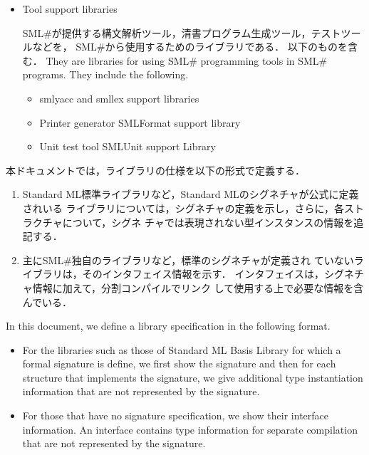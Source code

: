 \documentclass{jbook}
\newcommand{\txt}[2]{#2}
\newcommand{\smlsharp}{SML\#}
\begin{document}
\begin{itemize}
\item \txt{ツールのサポートライブラリ}{Tool support libraries}

\ifjp%
	\smlsharp{}が提供する構文解析ツール，清書プログラム生成ツール，テストツールなどを，
\smlsharp{}から使用するためのライブラリである．
	以下のものを含む．
\else%
	They are libraries for using \smlsharp{} programming tools in 
\smlsharp{} programs.
	They include the following.
\fi%

\begin{itemize}
\item \txt{smlyaccとsmllexのサポートライブラリ}{smlyacc and smllex
support libraries}
\item \txt{清書ツールSMLFormatサポートライブラリ}{Printer generator SMLFormat support library}
\item \txt{ユニットテストツールSMLUnitサポートライブラリ}{Unit test tool SMLUnit support Library}
\end{itemize}
\end{itemize}

\ifjp%
	本ドキュメントでは，ライブラリの仕様を以下の形式で定義する．
\begin{enumerate}
\item Standard ML標準ライブラリなど，Standard MLのシグネチャが公式に定義されいる
ライブラリについては，シグネチャの定義を示し，さらに，各ストラクチャについて，シグネ
チャでは表現されない型インスタンスの情報を追記する．
\item 	主に\smlsharp{}独自のライブラリなど，標準のシグネチャが定義され
ていないライブラリは，そのインタフェイス情報を示す．
	インタフェイスは，シグネチャ情報に加えて，分割コンパイルでリンク
して使用する上で必要な情報を含んでいる．
\end{enumerate}
\else%
	In this document, we define a library specification in the
following format.
\begin{itemize}
\item For the libraries such as those of Standard ML Basis Library for
which a formal signature is define, we first show the signature and then
for each structure that implements the signature, we give additional
type instantiation information that are not represented by the signature.
\item For those that have no signature specification, we show
their interface information.
	An interface contains type information for separate compilation
that are not represented by the signature.
\end{itemize}
\fi%
\end{document}

